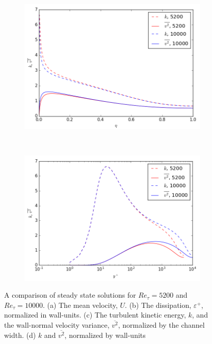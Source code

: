 \documentclass[a4paper,11pt]{article}
\begin{document}
\begin{figure}
	\begin{subfigure}[b]{0.45\textwidth} %
		\includegraphics[width=\textwidth]{k_y_10000}
		\caption{}
		\label{fig:results_v2_10000}
	\end{subfigure}
	~
	\begin{subfigure}[b]{0.45\textwidth} %
		\includegraphics[width=\textwidth]{k_yp_10000}
		\caption{}
		\label{fig:results_eps_10000}
	\end{subfigure}	
	\caption{A comparison of steady state solutions for $Re_{\tau} = 5200$ and $Re_{\tau} = 10000$. (a) The mean velocity, $U$. (b) The dissipation, $\varepsilon^+$, normalized in wall-units. (c) The turbulent kinetic energy, $k$, and the wall-normal velocity variance, $\overline{v^2}$, normalized by the channel width. (d) $k$ and $\overline{v^2}$, normalized by wall-units}
	\label{fig:Re10000_all}
\end{figure}
\end{document}
